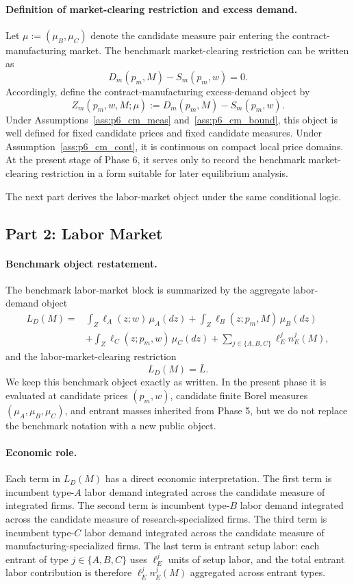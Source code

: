 \paragraph{Definition of market-clearing restriction and excess demand.}
Let $\mu:=(\mu_B,\mu_C)$ denote the candidate measure pair entering the contract-manufacturing market. The benchmark market-clearing restriction can be written as
\[
D_m(p_m,M)-S_m(p_m,w)=0.
\]
Accordingly, define the contract-manufacturing excess-demand object by
\[
Z_m(p_m,w,M;\mu):=D_m(p_m,M)-S_m(p_m,w).
\]
Under Assumptions~\ref{ass:p6_cm_meas} and~\ref{ass:p6_cm_bound}, this object is well defined for fixed candidate prices and fixed candidate measures. Under Assumption~\ref{ass:p6_cm_cont}, it is continuous on compact local price domains. At the present stage of Phase 6, it serves only to record the benchmark market-clearing restriction in a form suitable for later equilibrium analysis.

The next part derives the labor-market object under the same conditional logic.

\subsection{Part 2: Labor Market}

\paragraph{Benchmark object restatement.}
The benchmark labor-market block is summarized by the aggregate labor-demand object
\[
\begin{aligned}
L_D(M)={}&\int_Z \ell_A(z;w)\,\mu_A(dz)
+\int_Z \ell_B(z;p_m,M)\,\mu_B(dz)\\
&+\int_Z \ell_C(z;p_m,w)\,\mu_C(dz)
+\sum_{j\in\{A,B,C\}}\ell_E^j n_E^j(M),
\end{aligned}
\]
and the labor-market-clearing restriction
\[
L_D(M)=\bar L.
\]
We keep this benchmark object exactly as written. In the present phase it is evaluated at candidate prices $(p_m,w)$, candidate finite Borel measures $(\mu_A,\mu_B,\mu_C)$, and entrant masses inherited from Phase 5, but we do not replace the benchmark notation with a new public object.

\paragraph{Economic role.}
Each term in $L_D(M)$ has a direct economic interpretation. The first term is incumbent type-$A$ labor demand integrated across the candidate measure of integrated firms. The second term is incumbent type-$B$ labor demand integrated across the candidate measure of research-specialized firms. The third term is incumbent type-$C$ labor demand integrated across the candidate measure of manufacturing-specialized firms. The last term is entrant setup labor: each entrant of type $j\in\{A,B,C\}$ uses $\ell_E^j$ units of setup labor, and the total entrant labor contribution is therefore $\ell_E^j n_E^j(M)$ aggregated across entrant types.

